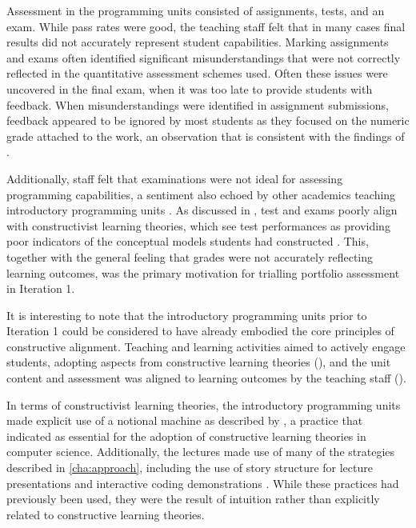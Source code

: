 Assessment in the programming units consisted of assignments, tests, and an exam. While pass rates were good, the teaching staff felt that in many cases final results did not accurately represent student capabilities. Marking assignments and exams often identified significant misunderstandings that were not correctly reflected in the quantitative assessment schemes used. Often these issues were uncovered in the final exam, when it was too late to provide students with feedback. When misunderstandings were identified in assignment submissions, feedback appeared to be ignored by most students as they focused on the numeric grade attached to the work, an observation that is consistent with the findings of \citet{Black:1998}. 

Additionally, staff felt that examinations were not ideal for assessing programming capabilities, a sentiment also echoed by other academics teaching introductory programming units \cite{Sheard:2013}. As discussed in , test and exams poorly align with constructivist learning theories, which see test performances as providing poor indicators of the conceptual models students had constructed \citet{BenAri:2001}. This, together with the general feeling that grades were not accurately reflecting learning outcomes, was the primary motivation for trialling portfolio assessment in Iteration 1.

It is interesting to note that the introductory programming units prior to Iteration 1 could be considered to have already embodied the core principles of constructive alignment. Teaching and learning activities aimed to actively engage students, adopting aspects from constructive learning theories (), and the unit content and assessment was aligned to learning outcomes by the teaching staff (). 

In terms of constructivist learning theories, the introductory programming units made explicit use of a notional machine as described by \citet{DuBoulay:1986}, a practice that \citet{BenAri:1998,BenAri:2001} indicated as essential for the adoption of constructive learning theories in computer science. Additionally, the lectures made use of many of the strategies described in \cref{cha:approach}, including the use of story structure for lecture presentations \cite{Atkinson:2007} and interactive coding demonstrations \cite{VanGorp:2001}. While these practices had previously been used, they were the result of intuition rather than explicitly related to constructive learning theories.

